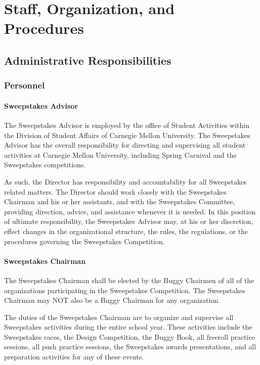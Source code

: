 \chapter{Staff, Organization, and Procedures}

\section{Administrative Responsibilities}

\subsection{Personnel}

\subsubsection{Sweepstakes Advisor}

	The Sweepstakes Advisor is employed by the office of Student Activities within
	the Division of Student Affairs of Carnegie Mellon University. The Sweepstakes
	Advisor has the overall responsibility for directing and supervising all
	student activities at Carnegie Mellon University, including Spring Carnival and
	the Sweepstakes competitions.

	As such, the Director has responsibility and accountability for all Sweepstakes
	related matters. The Director should work closely with the Sweepstakes Chairman
	and his or her assistants, and with the Sweepstakes Committee, providing
	direction, advice, and assistance whenever it is needed. In this position of
	ultimate responsibility, the Sweepstakes Advisor may, at his or her discretion,
	effect changes in the organizational structure, the rules, the regulations, or
	the procedures governing the Sweepstakes Competition.

\subsubsection{Sweepstakes Chairman}

	The Sweepstakes Chairman shall be elected by the Buggy Chairmen of all of the
	organizations participating in the Sweepstakes Competition. The Sweepstakes
	Chairman may NOT also be a Buggy Chairman for any organization.

	The duties of the Sweepstakes Chairman are to organize and supervise all
	Sweepstakes activities during the entire school year. These activities include
	the Sweepstakes races, the Design Competition, the Buggy Book, all freeroll
	practice sessions, all push practice sessions, the Sweepstakes awards
	presentations, and all preparation activities for any of these events.

